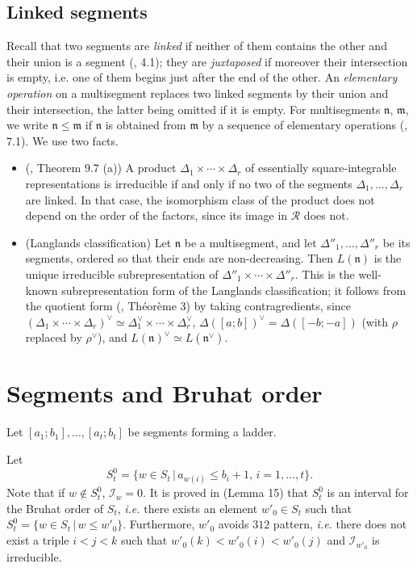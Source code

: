 \documentclass[a4paper,12pt,leqno]{amsart}
\newcommand{\frmm}{\mathfrak{m}}
\newcommand{\frn}{\mathfrak{n}}
\newcommand{\caI}{\mathcal{I}}
\newcommand{\caR}{\mathcal{R}}
\theoremstyle{plain}
\theoremstyle{definition}
\theoremstyle{definition}
\begin{document}
\subsection{Linked segments}\label{ssec:Z}
Recall that two segments are \emph{linked} if neither of them contains the other and their union is
a segment (\cite{Zel80}, 4.1); they are \emph{juxtaposed} if moreover their intersection is
empty, i.e. one of them begins just after the end of the other. An \emph{elementary operation} on a multisegment replaces two linked
segments by their union and their intersection, the latter being omitted if it is empty. For
multisegments $\frn$, $\frmm$, we write $\frn\leq\frmm$ if $\frn$ is obtained from $\frmm$ by a
sequence of elementary operations (\cite{Zel80}, 7.1). We use two facts.
\begin{itemize}
\item[(Z)] (\cite{Zel80}, Theorem 9.7 (a)) A product $\Delta_1\times\cdots\times\Delta_r$ of
essentially square-integrable representations is irreducible if and only if no two of the segments
$\Delta_1,\ldots,\Delta_r$ are linked. In that case, the isomorphism class of the product does not
depend on the order of the factors, since its image in $\caR$ does not.
\item[(L)] (Langlands classification) Let $\frn$ be a multisegment, and let
$\Delta''_1,\ldots,\Delta''_r$ be its segments, ordered so that their ends are non-decreasing. Then
$L(\frn)$ is the unique irreducible subrepresentation of
$\Delta''_1\times\cdots\times\Delta''_r$. This is the well-known subrepresentation form of the
Langlands classification; it follows from the quotient form (\cite{Rod82}, Th\'eor\`eme 3) by taking
contragredients, since $(\Delta_1\times\cdots\times\Delta_r)^\vee\simeq\Delta_1^\vee\times\cdots\times
\Delta_r^\vee$, $\Delta([a;b])^\vee=\Delta([-b;-a])$ (with $\rho$ replaced by $\rho^\vee$), and
$L(\frn)^\vee\simeq L(\frn^\vee)$.
\end{itemize}



\section{Segments and Bruhat order}\label{sec:bruhat}

 Let $ [a_1; b_1], \ldots , [a_t; b_t ]$  be segments forming a ladder.

Let
\[ S_t^0=\{w \in S_t \, \vert \, a_{w(i)}\leq b_i+1, \, i=1,\ldots ,t\}.\]
Note that if $w \notin  S_t^0$, $\caI_w=0$.
It is proved in \cite{LM13} (Lemma 15) that $S_t^0$ is an interval for the Bruhat order of $S_t$,
{\sl i.e.} there exists
an element  $w'_0\in S_t$ such that $S_t^0=\{w \in S_t \, \vert\, w\leq w'_0\}$.
Furthermore, $w'_0$ avoids $312$ pattern, {\sl i.e.} there does not exist a triple $i<j<k$ such that
$w'_0(k)<w'_0(i)<w'_0(j)$ and  $\caI_{w'_0}$ is irreducible.
\end{document}
